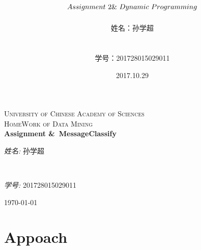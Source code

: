 \documentclass[a4paper,11pt,twoside,openany]{article}
\begin{document}
\begin{CJK*}{UTF8}{gbsn}
\begin{titlepage}
\begin{center}


   

\textsc{\LARGE University of  Chinese Academy of Sciences}\\[2.5cm]

\textsc{\Large HomeWork of Data Mining}\\[2.5cm]



{ \huge \bfseries Assignment \linebreak \&\ 
MessageClassify}\\[5.4cm]



\begin{minipage}{0.4\textwidth}
\begin{center} \LARGE
\emph{姓名:} 孙学超
\end{center}
\end{minipage}\\[2.5cm]

\begin{minipage}{0.4\textwidth}
\begin{center} \Large
\emph{学号:} 201728015029011
\end{center}
\end{minipage}


\vfill

{\Large \today}

\end{center}
\setcounter{page}{0}
\end{titlepage}
\title{$Assignment\ 2\linebreak \&\ 
Dynamic\ Programming$ }

\author{\large 姓名：孙学超 \\ \\ \\
学号：201728015029011 }
\date{2017.10.29}

\newpage

\section{Appoach}


\end{CJK*}
\end{document}
